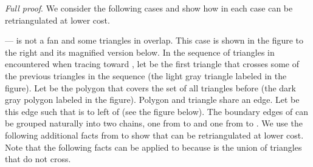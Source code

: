 \documentclass[final]{siamltex}
\newenvironment{fullproof}{\par{\it Full proof}. \ignorespaces}{\endproof}
\begin{document}
\begin{fullproof}
We consider the following cases and show how in each case  can be retriangulated at lower cost.



 ---  is not a fan and some triangles in  overlap.
This case is shown in the figure to the right and its magnified version below.
In the sequence of triangles in  
encountered when tracing  toward , let  be the first triangle 
that crosses some of the previous triangles in the sequence (the light gray triangle labeled in the figure).
Let  be the polygon that covers the set of all triangles before  (the dark gray polygon labeled  in the figure).
Polygon  and triangle  share an edge. Let  be this edge such that  is to left of  (see the figure below).
The boundary edges of  can be grouped naturally into two chains, one from  to  and 
one from  to .
We use the following additional facts from \cite{drysdale2001exclusion} to show that  can be retriangulated at lower cost.
Note that the following facts can be applied to  because 
 is the union of triangles that do not cross.
\end{window}


\end{fullproof}
\end{document}
